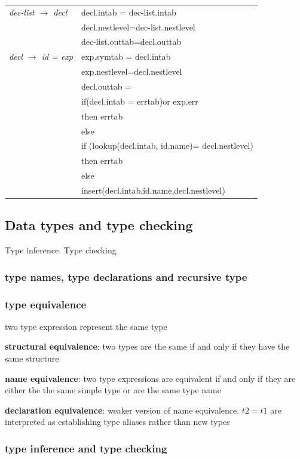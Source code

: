 \documentclass[11pt]{article}
\begin{document}
\begin{center}
\begin{tabular}{ll}
\hline
\emph{dec-list \(\to\) decl} & decl.intab = dec-list.intab\\
 & decl.nestlevel=dec-list.nestlevel\\
 & dec-list.outtab=decl.outtab\\
\hline
\emph{decl \(\to\) id = exp} & exp.symtab = decl.intab\\
 & exp.nestlevel=decl.nestlevel\\
 & decl.outtab =\\
 & if(decl.intab = errtab)or exp.err\\
 & then errtab\\
 & else\\
 & if (lookup(decl.intab, id.name)= decl.nestlevel)\\
 & then errtab\\
 & else\\
 & insert(decl.intab,id.name,decl.nestlevel)\\
\end{tabular}
\end{center}
\rmfamily

\subsection{Data types and type checking}
\label{sec:org8f574f2}
Type inference. Type checking

\subsubsection{type names, type declarations and recursive type}
\label{sec:orgdf13641}

\subsubsection{type equivalence}
\label{sec:org015c055}
two type expression represent the same type

\textbf{structural equivalence}: two types are the same if and only if they have the same structure

\textbf{name equivalence}: two type expressions are equivalent if and only if they are either the
the same simple type or are the same type name

\textbf{declaration equivalence}: weaker version of name equivalence. \(t2=t1\) are interpreted
as establishing type aliases rather than new types

\subsubsection{type inference and type checking}
\label{sec:org9e3fcef}
\end{document}
